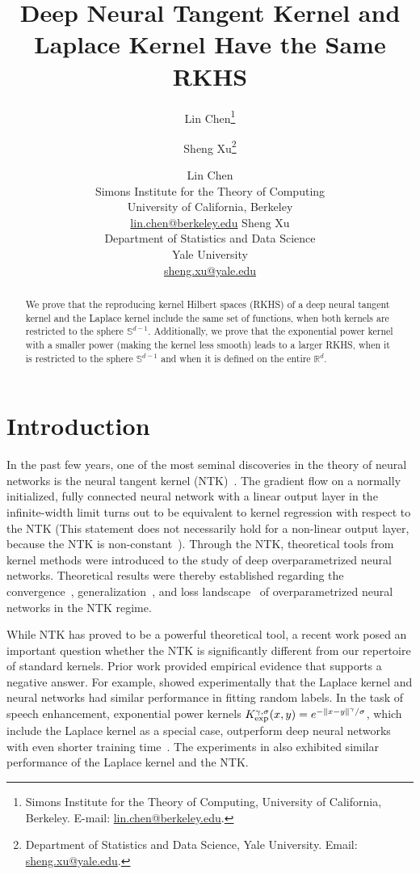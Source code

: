 \documentclass[11pt]{article}
\title{Deep Neural Tangent Kernel and Laplace Kernel Have the Same RKHS }
\author{Lin Chen\thanks{Simons Institute for the Theory of Computing,  University of California, Berkeley. E-mail: \href{mailto:lin.chen@berkeley.com}{lin.chen@berkeley.edu}.
 } \and Sheng Xu\thanks{Department of Statistics and Data Science, Yale University. Email: 
 \href{mailto:sheng.xu@yale.edu}{sheng.xu@yale.edu}.
 }
 }
\author{Lin Chen\\
Simons Institute for the Theory of Computing \\
University of California, Berkeley\\
\href{mailto:lin.chen@berkeley.com}{lin.chen@berkeley.edu}
\And Sheng Xu \\
Department of Statistics and Data Science\\
Yale University\\
\href{mailto:sheng.xu@yale.edu}{sheng.xu@yale.edu}
}
\date{}
\newcommand{\kexp}{K_{\textnormal{exp}}}
\begin{document}
\maketitle 

\doparttoc %
\faketableofcontents %

\begin{abstract}
    We prove that the reproducing kernel Hilbert spaces (RKHS) of a deep neural tangent kernel and the Laplace kernel include the same set of functions, when both kernels are restricted to the sphere $\mathbb{S}^{d-1}$. Additionally, we prove that the exponential power kernel with a smaller power (making the kernel less smooth) leads to a larger RKHS, when it is restricted to the sphere $\mathbb{S}^{d-1}$ and when it is defined on the entire $\mathbb{R}^d$. 
\end{abstract}

\section{Introduction}
In the past few years, one of the most seminal discoveries in the theory of neural networks is the neural tangent kernel (NTK)~\citep{jacot2018neural}. The gradient flow on a normally initialized, fully connected neural network with a linear output layer
in the infinite-width limit turns out to be equivalent to kernel regression with respect to the NTK (This statement does not necessarily hold for a non-linear output layer, because the NTK is non-constant~\citep{liu2020toward}). Through the NTK, theoretical tools from kernel methods were introduced to the study of deep overparametrized neural networks. Theoretical results were thereby established regarding the convergence~\citep{allen2019convergence,du2018gradient,du2019gradient,zou2020gradient}, generalization~\citep{cao2019generalization,arora2019fine}, and loss landscape~\citep{kuditipudi2019explaining} of overparametrized neural networks in the NTK regime. 

While NTK has proved to be a powerful theoretical tool, a recent work \citep{geifman2020similarity} posed an important question whether the NTK is significantly different from our repertoire of standard kernels. Prior work provided empirical evidence that supports a negative answer. For example, \citet{belkin2018understand} showed experimentally that the Laplace kernel and neural networks had similar performance in fitting random labels. In the task of speech enhancement, exponential power kernels $
\kexp^{\gamma,\sigma}(x,y) = e^{-\|x-y\|^\gamma/\sigma}$, which include the Laplace kernel as a special case, outperform deep neural networks with even shorter training time~\citep{hui2019kernel}. The experiments in \citep{geifman2020similarity} also exhibited similar performance of the Laplace kernel and the NTK. 
\end{document}
